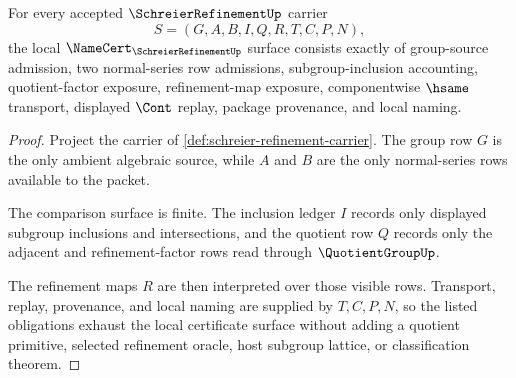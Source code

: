 \begin{theorem}
\label{thm:schreier-refinement-namecert-obligations}
For every accepted $\SchreierRefinementUp$ carrier
$$
S=(G,A,B,I,Q,R,T,C,P,N),
$$
the local $\NameCert_{\SchreierRefinementUp}$ surface consists exactly of group-source admission, two normal-series row admissions, subgroup-inclusion accounting, quotient-factor exposure, refinement-map exposure, componentwise $\hsame$ transport, displayed $\Cont$ replay, package provenance, and local naming.
\end{theorem}
\begin{proof}
Project the carrier of \autoref{def:schreier-refinement-carrier}. The group row $G$ is the only ambient algebraic source, while $A$ and $B$ are the only normal-series rows available to the packet.

The comparison surface is finite. The inclusion ledger $I$ records only displayed subgroup inclusions and intersections, and the quotient row $Q$ records only the adjacent and refinement-factor rows read through $\QuotientGroupUp$.

The refinement maps $R$ are then interpreted over those visible rows. Transport, replay, provenance, and local naming are supplied by $T,C,P,N$, so the listed obligations exhaust the local certificate surface without adding a quotient primitive, selected refinement oracle, host subgroup lattice, or classification theorem.
\end{proof}

